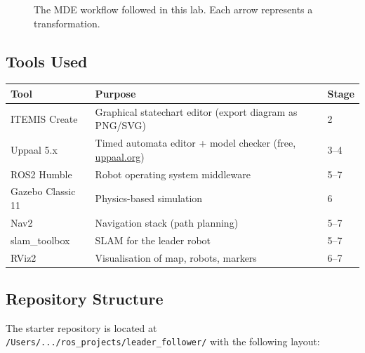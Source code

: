 \documentclass[11pt, a4paper]{article}
\begin{document}
\begin{figure}[H]
\caption{The MDE workflow followed in this lab. Each arrow represents a transformation.}
\label{fig:mde_workflow}
\end{figure}

\subsection{Tools Used}

\begin{center}
\begin{tabularx}{0.92\textwidth}{lXl}
\toprule
\textbf{Tool} & \textbf{Purpose} & \textbf{Stage} \\
\midrule
ITEMIS Create  & Graphical statechart editor (export diagram as PNG/SVG)       & 2 \\
Uppaal 5.x     & Timed automata editor + model checker (free, \url{uppaal.org}) & 3–4 \\
ROS2 Humble    & Robot operating system middleware & 5–7 \\
Gazebo Classic 11 & Physics-based simulation & 6 \\
Nav2           & Navigation stack (path planning) & 5–7 \\
slam\_toolbox  & SLAM for the leader robot & 5–7 \\
RViz2          & Visualisation of map, robots, markers & 6–7 \\
\bottomrule
\end{tabularx}
\end{center}

\subsection{Repository Structure}

The starter repository is located at \texttt{/Users/.../ros\_projects/leader\_follower/}
with the following layout:
\end{document}
